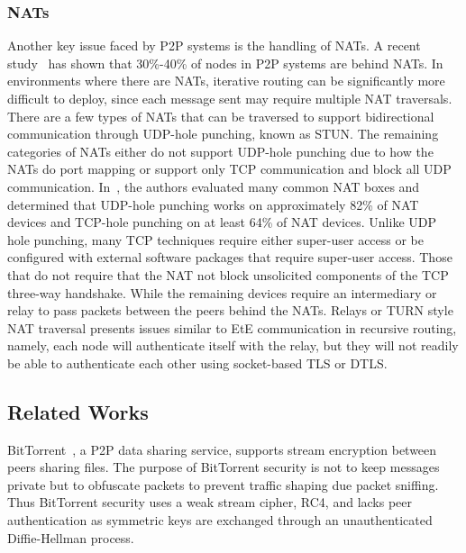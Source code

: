 \documentclass[conference]{IEEEtran}
\begin{document}
\subsubsection{NATs}
Another key issue faced by P2P systems is the handling of NATs.
A recent study~\cite{p2p_nats} has shown that 30\%-40\% of nodes in P2P systems
are behind NATs.  In environments where there are NATs, iterative routing can be
significantly more difficult to deploy, since each message sent may require
multiple NAT traversals.  There are a few types of NATs that can be traversed
to support bidirectional communication through UDP-hole punching, known as STUN.
The remaining categories of NATs either do not support UDP-hole punching due to
how the NATs do port mapping or support only TCP communication and block all
UDP communication.  In~\cite{tcp_nat, p2p_nat}, the authors evaluated many
common NAT boxes and determined that UDP-hole punching works on approximately
82\% of NAT devices and TCP-hole punching on at least 64\% of NAT devices.
Unlike UDP hole punching, many TCP techniques require either super-user access
or be configured with external software packages that require super-user access.
Those that do not require that the NAT not block unsolicited components of the
TCP three-way handshake.
While the remaining devices require an intermediary or relay to pass packets
between the peers behind the NATs.  Relays or TURN style NAT traversal
presents issues similar to EtE communication in recursive routing, namely, each
node will authenticate itself with the relay, but they will not readily be
able to authenticate each other using socket-based TLS or DTLS.

\subsection{Related Works}
BitTorrent~\cite{bittorrent_security}, a P2P data sharing service,  supports
stream encryption between peers sharing files.  The purpose of BitTorrent
security is not to keep messages private but to obfuscate packets to
prevent traffic shaping due packet sniffing. Thus BitTorrent security uses a
weak stream cipher, RC4, and lacks peer authentication as symmetric keys are
exchanged through an unauthenticated Diffie-Hellman process.
\end{document}
